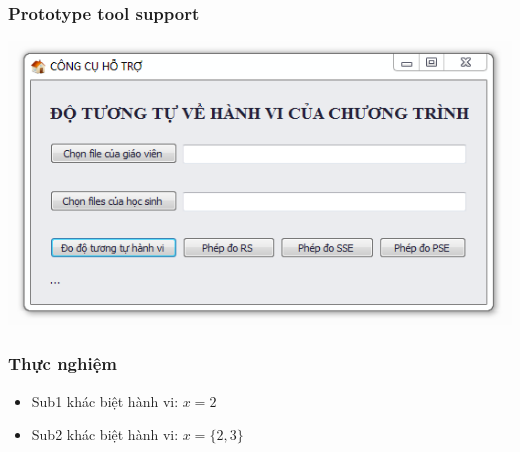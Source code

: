 \documentclass{beamer}
\begin{document}
\begin{frame}
  \frametitle{Prototype tool support}
 
  \centering
  \includegraphics[width=\linewidth]{images/main.png}
  
\end{frame}

\begin{frame}
  \frametitle{Thực nghiệm}
  \begin{minipage}[t]{0.32\linewidth}
  	\centering
  	
  \end{minipage}%
  \hfill\vrule\hfill
  \begin{minipage}[t]{0.32\linewidth}
  	\centering
  	
  \end{minipage}%
  \hfill\vrule\hfill
  \begin{minipage}[t]{0.32\linewidth}
  	\centering
  	
  \end{minipage}%
	\pause
	\begin{itemize}
		\item Sub1 khác biệt hành vi: $ x = 2$ \pause
		\item Sub2 khác biệt hành vi: $ x = \{2, 3\}$
	\end{itemize}
\end{frame}
\end{document}
